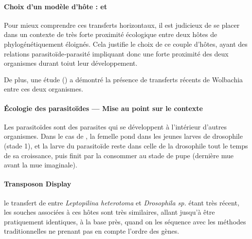 \paragraph{Choix d’un modèle d’hôte :  et \\}
Pour mieux comprendre ces transferts horizontaux, il est judicieux de se placer dans un contexte de très forte proximité écologique entre deux hôtes de  phylogénétiquement éloignés. Cela justifie le choix de ce couple d’hôtes, ayant des relations parasitoïde‐parasité impliquant donc une forte proximité des deux organismes durant toiut leur développement.

De plus, une étude (\cite{vavre1999}) a démontré la présence de transferts récents de Wolbachia entre ces deux organismes.

\begin{encart} %
	\paragraph{Écologie des parasitoïdes --- Mise au point sur le contexte} %
	\label{par:parasitoïdes}
	Les parasitoïdes sont des parasites qui se développent à l’intérieur d’autres organismes. Dans le cas de , la femelle pond dans les jeunes larves de drosophile (stade 1), et la larve du parasitoïde reste dans celle de la drosophile tout le temps de sa croissance, puis finit par la consommer au stade de pupe (dernière mue avant la mue imaginale).
\end{encart}

\paragraph{Transposon Display\\} %
\label{par:transposon_display}
le transfert de  entre \textit{Leptopilina heterotoma} et \textit{Drosophila sp.} étant très récent, les souches associées à ces hôtes sont très similaires, allant jusqu’à être pratiquement identiques, à la base près, quand on les séquence avec les méthodes traditionnelles ne prenant pas en compte l’ordre des gènes.


